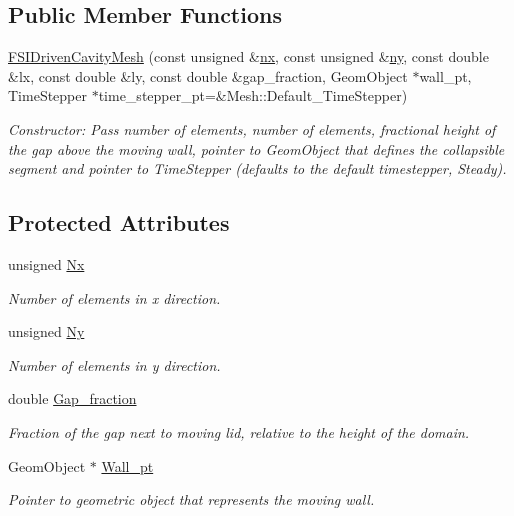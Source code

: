 \subsection*{Public Member Functions}
\begin{DoxyCompactItemize}
\item 
\hyperlink{classoomph_1_1FSIDrivenCavityMesh_af227477a1de5faf56352d21913a91feb}{F\+S\+I\+Driven\+Cavity\+Mesh} (const unsigned \&\hyperlink{classoomph_1_1SimpleRectangularQuadMesh_a4ff7678ec433180e2245ea2147f222b7}{nx}, const unsigned \&\hyperlink{classoomph_1_1SimpleRectangularQuadMesh_a45011f22dedd480392b1f376e4269921}{ny}, const double \&lx, const double \&ly, const double \&gap\+\_\+fraction, Geom\+Object $\ast$wall\+\_\+pt, Time\+Stepper $\ast$time\+\_\+stepper\+\_\+pt=\&Mesh\+::\+Default\+\_\+\+Time\+Stepper)
\begin{DoxyCompactList}\small\item\em Constructor\+: Pass number of elements, number of elements, fractional height of the gap above the moving wall, pointer to Geom\+Object that defines the collapsible segment and pointer to Time\+Stepper (defaults to the default timestepper, Steady). \end{DoxyCompactList}\end{DoxyCompactItemize}
\subsection*{Protected Attributes}
\begin{DoxyCompactItemize}
\item 
unsigned \hyperlink{classoomph_1_1FSIDrivenCavityMesh_a179f742e7bb521e8943107be3005d49b}{Nx}
\begin{DoxyCompactList}\small\item\em Number of elements in x direction. \end{DoxyCompactList}\item 
unsigned \hyperlink{classoomph_1_1FSIDrivenCavityMesh_af80a5662c2f61ebe49caba4ab08886b9}{Ny}
\begin{DoxyCompactList}\small\item\em Number of elements in y direction. \end{DoxyCompactList}\item 
double \hyperlink{classoomph_1_1FSIDrivenCavityMesh_ad95b3650cfa765b1ac6a0f131d407b23}{Gap\+\_\+fraction}
\begin{DoxyCompactList}\small\item\em Fraction of the gap next to moving lid, relative to the height of the domain. \end{DoxyCompactList}\item 
Geom\+Object $\ast$ \hyperlink{classoomph_1_1FSIDrivenCavityMesh_a4f05e03a223ac1f8370bdd39c56a5638}{Wall\+\_\+pt}
\begin{DoxyCompactList}\small\item\em Pointer to geometric object that represents the moving wall. \end{DoxyCompactList}\end{DoxyCompactItemize}


